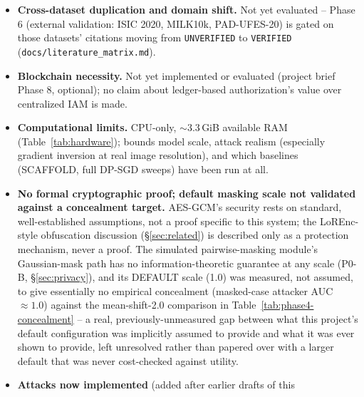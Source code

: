 \documentclass[11pt]{article}
\begin{document}
\begin{itemize}[nosep]
{illustrated, not just stated} (\S\ref{sec:integrity}): robust aggregation
needs to see each client's raw update to down-weight it, which is exactly
what simulated pairwise masking (\S\ref{sec:privacy}) hides;
this draft does not run the two together (i.e.\ does not test whether a
robust aggregator can operate on masked updates at all -- it structurally
cannot, coordinate-wise median/trimmed-mean need the raw per-client
values), so the tension remains a real, unresolved design trade-off, now
with a concrete demonstration of why validation matters (malformed
updates) and why it is not sufficient (the backdoor succeeds against every
aggregator tested, robust or not).
\item \textbf{Cross-dataset duplication and domain shift.} Not yet
evaluated -- Phase 6 (external validation: ISIC 2020, MILK10k,
PAD-UFES-20) is gated on those datasets' citations moving from
\texttt{UNVERIFIED} to \texttt{VERIFIED} (\texttt{docs/literature\_matrix.md}).
\item \textbf{Blockchain necessity.} Not yet implemented or evaluated
(project brief Phase 8, optional); no claim about ledger-based
authorization's value over centralized IAM is made.
\item \textbf{Computational limits.} CPU-only, $\sim$3.3\,GiB available RAM
(Table~\ref{tab:hardware}); bounds model scale, attack realism (especially
gradient inversion at real image resolution), and which baselines
(SCAFFOLD, full DP-SGD sweeps) have been run at all.
\item \textbf{No formal cryptographic proof; default masking scale not
validated against a concealment target.} AES-GCM's security rests on
standard, well-established assumptions, not a proof specific to this
system; the LoREnc-style obfuscation discussion (\S\ref{sec:related}) is
described only as a protection mechanism, never a proof. The simulated
pairwise-masking module's Gaussian-mask path has no information-theoretic
guarantee at any scale (P0-B, \S\ref{sec:privacy}), and its DEFAULT scale
(1.0) was measured, not assumed, to give essentially no empirical
concealment (masked-case attacker AUC $\approx 1.0$) against the
mean-shift-2.0 comparison in Table~\ref{tab:phase4-concealment} -- a real,
previously-unmeasured gap between what this project's default
configuration was implicitly assumed to provide and what it was ever shown
to provide, left unresolved rather than papered over with a larger default
that was never cost-checked against utility.
\item \textbf{Attacks now implemented} (added after earlier drafts of this

\end{itemize}
\end{document}
